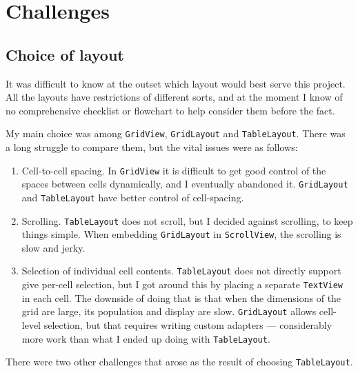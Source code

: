 \documentclass[11pt,asymmetric]{article}
\begin{document}


\section{Challenges}
\subsection{Choice of layout}
It was difficult to know at the outset which layout would best serve this project. All the layouts have restrictions of different sorts, and at the moment I know of no comprehensive checklist or flowchart to help consider them before the fact.

My main choice was among \texttt{GridView}, \texttt{GridLayout} and \texttt{TableLayout}. There was a long struggle to compare them, but the vital issues were as follows:\begin{enumerate}

\item Cell-to-cell spacing. In \texttt{GridView} it is difficult to get good control of the spaces between cells dynamically, and I eventually abandoned it. \texttt{GridLayout} and \texttt{TableLayout} have better control of cell-spacing. 

\item Scrolling. \texttt{TableLayout} does not scroll, but I decided against scrolling, to keep things simple. When embedding \texttt{GridLayout} in \texttt{ScrollView}, the scrolling is slow and jerky. 

\item Selection of individual cell contents. \texttt{TableLayout} does not directly support give per-cell selection, but I got around this by placing a separate \texttt{TextView} in each cell. The downside of doing that is that when the dimensions of the grid are large, its population and display are slow. \texttt{GridLayout} allows cell-level selection, but that requires writing custom adapters --- considerably more work than what I ended up doing with \texttt{TableLayout}.
\end{enumerate}

There were two other challenges that arose as the result of choosing \texttt{TableLayout}.
\end{document}

